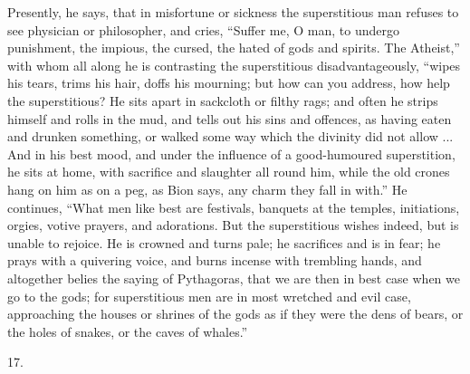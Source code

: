 Presently, he says, that in misfortune or sickness the
superstitious man refuses to see physician or
philosopher, and cries, ``Suffer me, O man, to
undergo punishment, the impious, the cursed, the hated of
gods and spirits. The Atheist,'' with whom all along
he is contrasting the superstitious disadvantageously,
``wipes his tears, trims his hair, doffs his
mourning; but how can you address, how help the
superstitious? He sits apart in sackcloth or filthy rags;
and often he strips himself and rolls in the mud, and
tells out his sins and offences, as having eaten and
drunken something, or walked some way which the divinity
did not allow ... And in his best mood, and under the
influence of a good-humoured superstition, he sits at
home, with sacrifice and slaughter all round him, while
the old crones hang on him as on a peg, as Bion says, any
charm they fall in with.'' He continues, ``What
men like best are festivals, banquets at the temples,
initiations, orgies, votive prayers, and adorations. But
the superstitious wishes indeed, but is unable to
rejoice. He is crowned and turns pale; he sacrifices and
is in fear; he prays with a quivering voice, and burns
incense with trembling hands, and altogether belies the
saying of Pythagoras, that we are then in best case when
we go to the gods; for superstitious men are in most
wretched and evil case, approaching the houses or shrines
of the gods as if they were the dens of bears, or the
holes of snakes, or the caves of whales.''

17.

